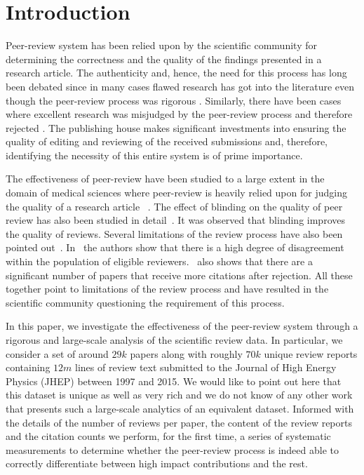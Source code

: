 \noindent
\section{Introduction}

Peer-review system has been relied upon by the scientific community for determining the correctness and the quality of the findings presented in a research article. The authenticity and, hence, the need for this process has long been debated since in many cases flawed research has got into the literature even though the peer-review process was rigorous \cite{bohannon2013s}. Similarly, there have been cases where excellent research was misjudged by the peer-review process and therefore rejected \cite{braatz2014papers}. The publishing house makes significant investments into ensuring the quality of editing and reviewing of the received submissions and, therefore, identifying the necessity of this entire system is of prime importance. 


The effectiveness of peer-review have been studied to a large extent in the domain of medical sciences where peer-review is heavily relied upon for judging the quality of a research article ~\cite{jefferson2006editorial,kassirer1994peer,
rennie1990editorial}. The effect of blinding on the quality of peer review has also been studied in detail~\cite{jefferson2002measuring, mcnutt1990effects}. It was observed that blinding improves the quality of reviews. Several limitations of the review process have also been pointed out~\cite{horrobin1990philosophical}. In~\cite{cole1981chance} the authors show that there is a high degree of disagreement within the population of eligible reviewers.~\cite{braatz2014papers} also shows that there are a significant number of papers that receive more citations after rejection. All these together point to limitations of the review process and have resulted in the scientific community questioning the requirement of this process. 

 In this paper, we investigate the effectiveness of the peer-review system through a rigorous and large-scale analysis of the scientific review data. In particular, we consider a set of around $29k$ papers along with roughly $70k$ unique review reports containing $12m$ lines of review text submitted to the Journal of High Energy Physics (JHEP) between 1997 and 2015. We would like to point out here that this dataset is unique as well as very rich and we do not know of any other work that presents such a large-scale analytics of an equivalent dataset. Informed with the details of the number of reviews per paper, the content of the review reports and the citation counts we perform, for the first time, a series of systematic measurements to determine whether the peer-review process is indeed able to correctly differentiate between high impact contributions and the rest.

